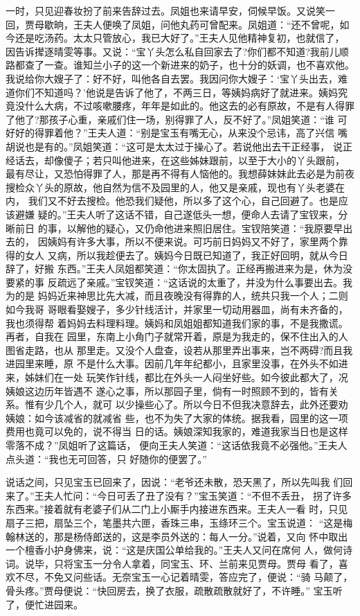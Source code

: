 一时，只见迎春妆扮了前来告辞过去。凤姐也来请早安，伺候早饭。又说笑一
回，贾母歇晌，王夫人便唤了凤姐，问他丸药可曾配来。凤姐道：“还不曾呢，如
今还是吃汤药。太太只管放心，我已大好了。”王夫人见他精神复初，也就信了，
因告诉撵逐晴雯等事。又说：“宝丫头怎么私自回家去了?你们都不知道?我前儿顺
路都查了一查。谁知兰小子的这一个新进来的奶子，也十分的妖调，也不喜欢他。
我说给你大嫂子了：好不好，叫他各自去罢。我因问你大嫂子：‘宝丫头出去，难
道你们不知道吗？’他说是告诉了他了，不两三日，等姨妈病好了就进来。姨妈究
竟没什么大病，不过咳嗽腰疼，年年是如此的。他这去的必有原故，不是有人得罪
了他了?那孩子心重，亲戚们住一场，别得罪了人，反不好了。”凤姐笑道：“谁
可好好的得罪着他？”王夫人道：“别是宝玉有嘴无心，从来没个忌讳，高了兴信
嘴胡说也是有的。”凤姐笑道：“这可是太太过于操心了。若说他出去干正经事，
说正经话去，却像傻子；若只叫他进来，在这些姊妹跟前，以至于大小的丫头跟前，
最有尽让，又恐怕得罪了人，那是再不得有人恼他的。我想薛妹妹此去必是为前夜
搜检众丫头的原故，他自然为信不及园里的人，他又是亲戚，现也有丫头老婆在内，
我们又不好去搜检。他恐我们疑他，所以多了这个心，自己回避了。也是应该避嫌
疑的。”王夫人听了这话不错，自己遂低头一想，便命人去请了宝钗来，分晰前日
的事，以解他的疑心，又仍命他进来照旧居住。宝钗陪笑道：“我原要早出去的，
因姨妈有许多大事，所以不便来说。可巧前日妈妈又不好了，家里两个靠得的女人
又病，所以我趁便去了。姨妈今日既已知道了，我正好回明，就从今日辞了，好搬
东西。”王夫人凤姐都笑道：“你太固执了。正经再搬进来为是，休为没要紧的事
反疏远了亲戚。”宝钗笑道：“这话说的太重了，并没为什么事要出去。我为的是
妈妈近来神思比先大减，而且夜晚没有得靠的人，统共只我一个人；二则如今我哥
哥眼看娶嫂子，多少针线活计，并家里一切动用器皿，尚有未齐备的，我也须得帮
着妈妈去料理料理。姨妈和凤姐姐都知道我们家的事，不是我撒谎。再者，自我在
园里，东南上小角门子就常开着，原是为我走的，保不住出入的人图省走路，也从
那里走。又没个人盘查，设若从那里弄出事来，岂不两碍?而且我进园里来睡，原
不是什么大事。因前几年年纪都小，且家里没事，在外头不如进来，姊妹们在一处
玩笑作针线，都比在外头一人闷坐好些。如今彼此都大了，况姨娘这边历年皆遇不
遂心之事，所以那园子里，倘有一时照顾不到的，皆有关系。惟有少几个人，就可
以少操些心了。所以今日不但我决意辞去，此外还要劝姨娘：如今该减省的就减省
些，也不为失了大家的体统。据我看，园里的这一项费用也竟可以免的，说不得当
日的话。姨娘深知我家的，难道我家当日也是这样零落不成？”凤姐听了这篇话，
便向王夫人笑道：“这话依我竟不必强他。”王夫人点头道：“我也无可回答，只
好随你的便罢了。”

说话之间，只见宝玉已回来了，因说：“老爷还未散，恐天黑了，所以先叫我
们回来了。”王夫人忙问：“今日可丢了丑了没有？”宝玉笑道：“不但不丢丑，
拐了许多东西来。”接着就有老婆子们从二门上小厮手内接进东西来。王夫人一看
时，只见扇子三把，扇坠三个，笔墨共六匣，香珠三串，玉绦环三个。宝玉说道：
“这是梅翰林送的，那是杨侍郎送的，这是李员外送的：每人一分。”说着，又向
怀中取出一个檀香小护身佛来，说：“这是庆国公单给我的。”王夫人又问在席何
人，做何诗词。说毕，只将宝玉一分令人拿着，同宝玉、环、兰前来见贾母。贾母
看了，喜欢不尽，不免又问些话。无奈宝玉一心记着晴雯，答应完了，便说：“骑
马颠了，骨头疼。”贾母便说：“快回房去，换了衣服，疏散疏散就好了，不许睡。”
宝玉听了，便忙进园来。

